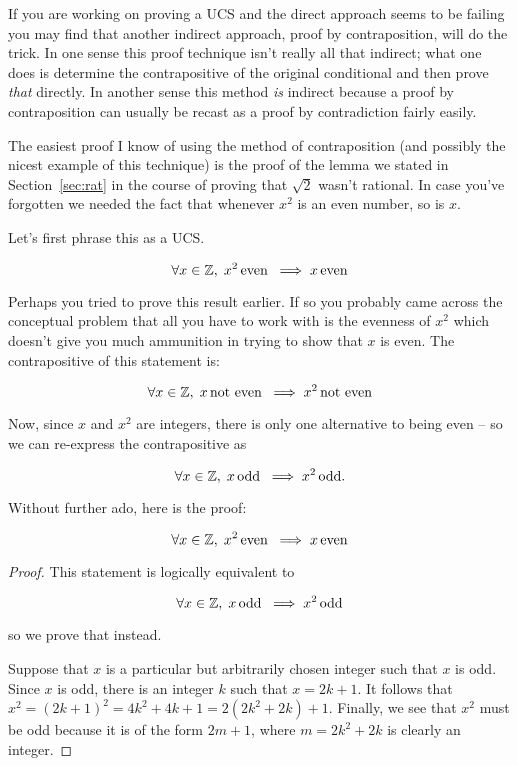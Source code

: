 If you are working on proving a UCS and the direct approach seems to be
failing you may find that another indirect approach, 
proof by contraposition,
will do the trick.  In one sense this proof technique isn't really all that
indirect; what one does is determine the contrapositive of the original
conditional and then prove {\em that} directly.  In another sense this 
method {\em is} indirect because a proof by contraposition can usually
be recast as a proof by contradiction fairly easily.  

The easiest proof I know of using the method of contraposition (and possibly
the nicest example of this technique)
is the proof of the lemma we stated in Section~\ref{sec:rat} in the course
of proving that $\sqrt{2}$ wasn't rational.  In case you've forgotten
we needed the fact that whenever $x^2$ is an even number, so is $x$.

Let's first phrase this as a UCS.

\[ \forall x \in {\mathbb Z}, \; x^2 \, \mbox{even} \; \implies x \, \mbox{even} 
\]

Perhaps you tried to prove this result earlier.  If so you probably
came across the conceptual problem that all you have to work with
is the evenness of $x^2$ which doesn't give you much ammunition
in trying to show that $x$ is even.  The contrapositive of this 
statement is:

\[ \forall x \in {\mathbb Z}, \; x \, \mbox{not even} \; 
\implies x^2 \, \mbox{not even} 
\]
 
Now, since $x$ and $x^2$ are integers, there is only one alternative to being
even -- so we can re-express the contrapositive as

\[ \forall x \in {\mathbb Z}, \; x \, \mbox{odd} \; \implies x^2 \, \mbox{odd}. 
\]

Without further ado, here is the proof:

\begin{thm}
\[ \forall x \in {\mathbb Z}, \; x^2 \, \mbox{even} \; 
\implies x \, \mbox{even} 
\]
\end{thm}
\begin{proof}
This statement is logically equivalent to 

\[ \forall x \in {\mathbb Z}, \; x \, \mbox{odd} \; \implies x^2 \, \mbox{odd} 
\]

\noindent so we prove that instead.

Suppose that $x$ is a particular but arbitrarily chosen integer
such that $x$ is odd.  Since $x$ is odd, there is an integer $k$ such that
$x=2k+1$.  It follows that 
$x^2 = (2k + 1)^2 = 4k^2 + 4k + 1 = 2(2k^2 + 2k) + 1$.
Finally, we see that $x^2$ must be odd because it is of the form $2m+1$, where
$m = 2k^2 + 2k$ is clearly an integer.
\end{proof}

